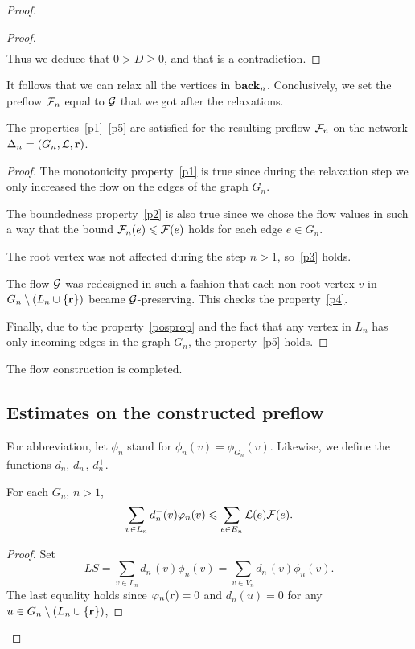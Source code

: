 \documentclass[12pt,oneside,a4paper]{amsart}
\begin{document}
\begin{proof}
\begin{proof}
\[\begin{split}
            \end{split}
          \]
          Thus we deduce that $0 > D \geq 0$, and that is a contradiction.
        \end{proof}
        It follows that we can relax all the vertices in $\eback_n$.
        Conclusively, we set the preflow $\flowposn{n}$ equal to $\cal{G}$ that we got after the relaxations.
        \begin{prop}
          The properties~\ref{p1}--\ref{p5} are satisfied for the resulting preflow $\flowposn{n}$ on the network $\net_n = (G_n, \len, \root)$.
        \end{prop}
        \begin{proof}
          The monotonicity property~\ref{p1} is true since during the relaxation step we
            only increased the flow on the edges of the graph $G_n$.

          The boundedness property~\ref{p2} is also true since we chose the flow values in such a way
            that the bound $\flowposn{n}(e) \leq \flowpos(e)$ holds for each edge $e\in G_n$.

          The root vertex was not affected during the step $n > 1$, so~\ref{p3} holds.

          The flow $\cal{G}$ was redesigned in such a fashion that each non-root vertex $v$ in $G_{n} \setminus 
            \left(L_n \cup \{\root\}\right)$ became $\cal{G}$-preserving.
          This checks the property~\ref{p4}.

          Finally, due to the property~\ref{posprop} and the fact that
          any vertex in $L_n$ has only incoming edges in the graph $G_n$, the property~\ref{p5} holds.
        \end{proof}
        The flow construction is completed.

        \medskip
        \subsection{Estimates on the constructed preflow}
          For abbreviation, let $\phi_n$ stand for $\phi_n(v) = \phi_{G_n}(v)$.
          Likewise, we define the functions $d_n$, $d^{-}_n$, $d^{+}_n$.
          \begin{lemma}
            For each $G_n$, $n > 1$,
            \begin{equation}
              \label{main-ineq}
              \sum_{v\in L_n}d_{n}^{-}(v) \phi_n(v) \leq \sum_{e \in E_n} \len(e) \flowpos(e).
            \end{equation}
          \end{lemma}
          \begin{proof}
            Set
            \[
              LS = \sum_{v \in L_n} d_n^{-}(v) \phi_n(v) = \sum_{v \in V_n} d_n^{-}(v) \phi_n(v).
            \]
            The last equality holds since $\phi_n(\root) = 0$ and $d_n(u) = 0$
              for any $u \in G_{n} \setminus \left(L_n \cup \{\root\}\right)$,


\end{proof}
\end{proof}
\end{document}
